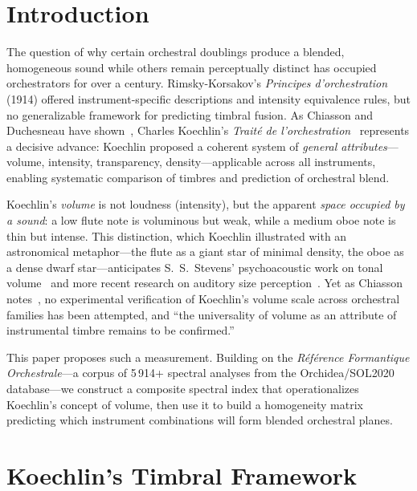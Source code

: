 \documentclass[journal]{IEEEtran}
\begin{document}
\section{Introduction}
\label{sec:intro}

The question of why certain orchestral doublings produce a blended, homogeneous sound while others remain perceptually distinct has occupied orchestrators for over a century. Rimsky-Korsakov's \textit{Principes d'orchestration} (1914) offered instrument-specific descriptions and intensity equivalence rules, but no generalizable framework for predicting timbral fusion. As Chiasson and Duchesneau have shown~\cite{Chiasson2008, DuchesneauChiasson}, Charles Koechlin's \textit{Traité de l'orchestration}~\cite{Koechlin1954} represents a decisive advance: Koechlin proposed a coherent system of \emph{general attributes}---volume, intensity, transparency, density---applicable across all instruments, enabling systematic comparison of timbres and prediction of orchestral blend.

Koechlin's \textit{volume} is not loudness (intensity), but the apparent \emph{space occupied by a sound}: a low flute note is voluminous but weak, while a medium oboe note is thin but intense. This distinction, which Koechlin illustrated with an astronomical metaphor---the flute as a giant star of minimal density, the oboe as a dense dwarf star---anticipates S.~S.~Stevens' psychoacoustic work on tonal volume~\cite{Stevens1965} and more recent research on auditory size perception~\cite{VanDinther2006}. Yet as Chiasson notes~\cite{ChiassonHumaniste}, no experimental verification of Koechlin's volume scale across orchestral families has been attempted, and ``the universality of volume as an attribute of instrumental timbre remains to be confirmed.''

This paper proposes such a measurement. Building on the \textit{Référence Formantique Orchestrale}---a corpus of 5\,914+ spectral analyses from the Orchidea/SOL2020 database---we construct a composite spectral index that operationalizes Koechlin's concept of volume, then use it to build a homogeneity matrix predicting which instrument combinations will form blended orchestral planes.

\section{Koechlin's Timbral Framework}
\label{sec:koechlin}
\end{document}
